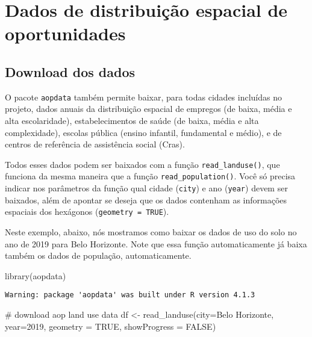 \documentclass[
  letterpaper,
  DIV=11,
  numbers=noendperiod]{scrreprt}
\newenvironment{Shaded}{\begin{snugshade}}{\end{snugshade}}
\newcommand{\AttributeTok}[1]{\textcolor[rgb]{0.40,0.45,0.13}{#1}}
\newcommand{\CommentTok}[1]{\textcolor[rgb]{0.37,0.37,0.37}{#1}}
\newcommand{\ConstantTok}[1]{\textcolor[rgb]{0.56,0.35,0.01}{#1}}
\newcommand{\DecValTok}[1]{\textcolor[rgb]{0.68,0.00,0.00}{#1}}
\newcommand{\FunctionTok}[1]{\textcolor[rgb]{0.28,0.35,0.67}{#1}}
\newcommand{\NormalTok}[1]{\textcolor[rgb]{0.00,0.23,0.31}{#1}}
\newcommand{\OtherTok}[1]{\textcolor[rgb]{0.00,0.23,0.31}{#1}}
\newcommand{\StringTok}[1]{\textcolor[rgb]{0.13,0.47,0.30}{#1}}
\begin{document}
\hypertarget{dados-de-distribuiuxe7uxe3o-espacial-de-oportunidades}{%
\chapter{Dados de distribuição espacial de
oportunidades}\label{dados-de-distribuiuxe7uxe3o-espacial-de-oportunidades}}

\hypertarget{download-dos-dados-1}{%
\section{Download dos dados}\label{download-dos-dados-1}}

O pacote \texttt{aopdata} também permite baixar, para todas cidades
incluídas no projeto, dados anuais da distribuição espacial de empregos
(de baixa, média e alta escolaridade), estabelecimentos de saúde (de
baixa, média e alta complexidade), escolas pública (ensino infantil,
fundamental e médio), e de centros de referência de assistência social
(Cras).

Todos esses dados podem ser baixados com a função
\texttt{read\_landuse()}, que funciona da mesma maneira que a função
\texttt{read\_population()}. Você só precisa indicar nos parâmetros da
função qual cidade (\texttt{city}) e ano (\texttt{year}) devem ser
baixados, além de apontar se deseja que os dados contenham as
informações espaciais dos hexágonos (\texttt{geometry\ =\ TRUE}).

Neste exemplo, abaixo, nós mostramos como baixar os dados de uso do solo
no ano de 2019 para Belo Horizonte. Note que essa função automaticamente
já baixa também os dados de população, automaticamente.

\begin{Shaded}
\begin{Highlighting}[]
\FunctionTok{library}\NormalTok{(aopdata)}
\end{Highlighting}
\end{Shaded}

\begin{verbatim}
Warning: package 'aopdata' was built under R version 4.1.3
\end{verbatim}

\begin{Shaded}
\begin{Highlighting}[]
\CommentTok{\# download aop land use data}
\NormalTok{df }\OtherTok{\textless{}{-}} \FunctionTok{read\_landuse}\NormalTok{(}\AttributeTok{city=}\StringTok{\textquotesingle{}Belo Horizonte\textquotesingle{}}\NormalTok{,}
                      \AttributeTok{year=}\DecValTok{2019}\NormalTok{,}
                      \AttributeTok{geometry =} \ConstantTok{TRUE}\NormalTok{,}
                      \AttributeTok{showProgress =} \ConstantTok{FALSE}\NormalTok{)}
\end{Highlighting}
\end{Shaded}
\end{document}
